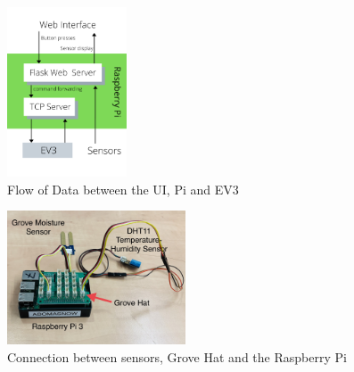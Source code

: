 \documentclass{article}
\begin{document}
\begin{figure}
    \centering
    \includegraphics[height=190,keepaspectratio,width=1\linewidth]{figs/NetworkDiagram.png}    \caption{Flow of Data between the UI, Pi and EV3}
    \label{Network Diagram}
\end{figure}
\begin{figure}
    \centering
    \includegraphics[height=150,keepaspectratio,width=1\linewidth]{figs/sensors_connection.jpeg}    \caption{Connection between sensors, Grove Hat and the Raspberry Pi}
    \label{Sensors Connection Diagram}
\end{figure}
\end{document}

